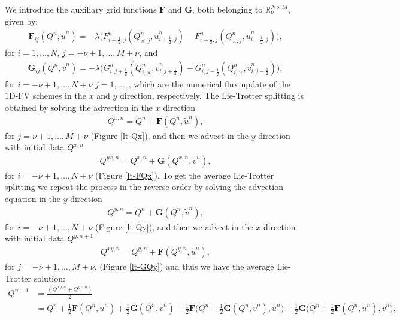 We introduce the auxiliary grid functions $\mathbf{F}$ and $\mathbf{G}$, both belonging to $\mathbb{R}^{N\times M}_{\nu}$, given by:
\begin{align*}
	\mathbf{F}_{ij}({Q^n,\tilde{u}^n}) = -\lambda \big({F}_{i+\frac{1}{2},j}^n(Q^n_{\times,j},\tilde{u}^n_{i+\frac{1}{2},j})-
                                                  {F}_{i-\frac{1}{2},j}^n(Q^n_{\times,j},\tilde{u}^n_{i-\frac{1}{2},j}) \big),
\end{align*}
for $i=1, \ldots, N$, $j=-\nu+1, \ldots, M + \nu$, and
\begin{align*}
	\mathbf{G}_{ij}({Q^n,\tilde{v}^n}) = -\lambda \big({G}_{i,j+\frac{1}{2}}^n(Q^n_{i,\times},\tilde{v}^n_{i,j+\frac{1}{2}})-
                                                  {G}_{i,j-\frac{1}{2}}^n(Q^n_{i,\times},\tilde{v}^n_{i,j-\frac{1}{2}}) \big),
\end{align*}
for $i=-\nu+1, \ldots, N + \nu$  $j=1, \ldots, $,
which are the numerical flux update of the 1D-FV schemes in the $x$ and $y$ direction, respectively.
The Lie-Trotter splitting is obtained by solving the advection in the $x$ direction
\begin{align*}
	{Q}^{x,n} =  {Q}^{n} + \mathbf{F}({Q^n}, \tilde{u}^n),
\end{align*}
for $j=\nu+1, \ldots, M+\nu$ (Figure \ref{lt-Qx}), and then we advect in the $y$ direction with initial data ${Q}^{x,n}$ 
\begin{align*}
	{Q}^{yx,n} = Q^{x,n} + \mathbf{G}({Q}^{x,n},\tilde{v}^n),
\end{align*}
for $i=-\nu+1, \ldots, N+\nu$ (Figure \ref{lt-FQx}).
To get the average Lie-Trotter splitting we repeat the process in the reverse order by solving the advection equation
in the $y$ direction
\begin{align*}
	{Q}^{y,n} =  {Q}^{n} + \mathbf{G}({Q^n},\tilde{v}^n),
\end{align*}
for $i=-\nu+1, \ldots, N+\nu$ (Figure \ref{lt-Qy}), and then we advect in the $x$-direction with initial data ${Q}^{y,n+1}$ 
\begin{align*}
	{Q}^{xy,n} = Q^{y,n} + \mathbf{F}(Q^{y,n},\tilde{u}^n),
\end{align*}
for $j=-\nu+1, \ldots, M+\nu$, (Figure \ref{lt-GQy}) and thus we have the average Lie-Trotter solution:
\begin{align*}
	Q^{n+1} &= \frac{(Q^{xy,n} + Q^{yx,n})}{2} \\
    &= Q^n + \frac{1}{2}\mathbf{F}(Q^n,\tilde{u}^n) + \frac{1}{2}\mathbf{G}(Q^n,\tilde{v}^n) + 
    \frac{1}{2}\mathbf{F}\bigg(Q^n + \frac{1}{2}\mathbf{G}(Q^n, \tilde{v}^n), \tilde{u}^n\bigg)+
    \frac{1}{2}\mathbf{G}\bigg(Q^n + \frac{1}{2}\mathbf{F}(Q^n, \tilde{u}^n), \tilde{v}^n\bigg),
\end{align*}

